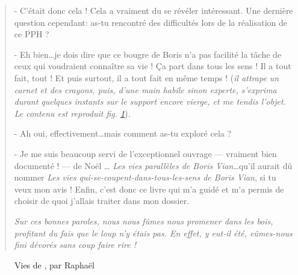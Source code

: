 \begin{quotation}
- C'était donc cela ! Cela a vraiment du se révéler intéressant. Une dernière question cependant:
as-tu rencontré des difficultés lors de la réalisation de ce PPH ?

- Eh bien\ldots je dois dire que ce bougre de Boris n'a pas facilité la tâche
de ceux qui voudraient connaître sa vie ! Ça part dans tous les sens ! Il a tout fait, tout !
Et puis surtout, il a tout fait en même temps !
(\emph{il attrape un carnet et des crayons, puis, d'une main habile sinon experte, s'exprima 
durant quelques instants sur le support encore vierge, et me tendis l'objet.
Le contenu est reproduit fig. \ref{carnet}}).

- Ah oui, effectivement\ldots mais comment as-tu exploré cela ?

- Je me suis beaucoup servi de l'exceptionnel ouvrage --- vraiment bien documenté ! --- de Noël \ldots
\emph{Les vies parallèles de Boris Vian}\ldots qu'il aurait dû nommer
\emph{Les vies qui-se-coupent-dans-tous-les-sens de Boris Vian}, si tu veux mon avis !
Enfin, c'est donc ce livre qui m'a guidé et m'a permis de choisir de quoi j'allais traiter
dans mon dossier.

\emph{Sur ces bonnes paroles, nous nous fûmes nous promener dans les bois,
profitant du fais que le loup n'y étais pas. En effet, y eut-il été,
eûmes-nous fini dévorés sans coup faire rire !}
 
\end{quotation}

\begin{figure}
\centering
\caption{Vies de \BV, par Raphaël }
\label{carnet}
\end{figure}

